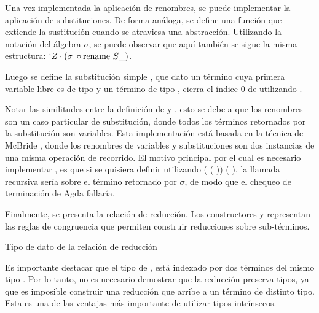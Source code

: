 \documentclass[]{report}
\begin{document}
	
	Una vez implementada la aplicación de renombres, se puede implementar la aplicación de substituciones.
	De forma análoga, se define una función  que extiende la sustitución cuando se atraviesa una abstracción.
	Utilizando la notación del álgebra-$\sigma$, se puede observar que aquí también se sigue la misma estructura: $`Z \cdot (\sigma \; \circ \text{rename } S\_)$.
	
	Luego se define la substitución simple \AgdaOperator{\AgdaFunction{$\_[\_]$}}, que dato un término  cuya primera variable libre es de tipo  y un término  de tipo , cierra el índice 0 de  utilizando .
	
	
	Notar las similitudes entre la definición de  y , esto se debe a que los renombres son un caso particular de substitución, donde todos los términos retornados por la substitución son variables.
	Esta implementación está basada en la técnica de McBride \cite{ren-sub}, donde los renombres de variables y substituciones son dos instancias de una misma operación de recorrido.
	El motivo principal por el cual es necesario implementar , es que si se quisiera definir  utilizando  (\AgdaSymbol{$\lambda$}  \AgdaSymbol{$\rightarrow$}  ( )) (\AgdaBound{$\sigma$} ), la llamada recursiva sería sobre el término retornado por $\sigma$, de modo que el chequeo de terminación de Agda fallaría.

	Finalmente, se presenta la relación de reducción.
	Los constructores \AgdaInductiveConstructor{$\xi$} y \AgdaInductiveConstructor{$\zeta$} representan las reglas de congruencia que permiten construir reducciones sobre sub-términos.

	\begin{codigo}
		Tipo de dato de la relación de reducción
		
	\end{codigo}
	
	Es importante destacar que el tipo de \AgdaDatatype{$\_\hookrightarrow\_$}, está indexado por dos términos del mismo tipo .
	Por lo tanto, no es necesario demostrar que la reducción preserva tipos, ya que es imposible construir una reducción que arribe a un término de distinto tipo.
	Esta es una de las ventajas más importante de utilizar tipos intrínsecos.
	
\end{document}
